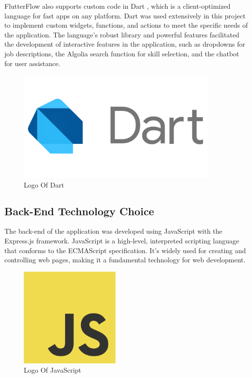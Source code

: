 FlutterFlow also supports custom code in {\color{purple} Dart} \cite{dart}, which is a client-optimized language for fast apps on any platform. Dart was used extensively in this project to implement custom widgets, functions, and actions to meet the specific needs of the application. The language's robust library and powerful features facilitated the development of interactive features in the application, such as dropdowns for job descriptions, the Algolia search function for skill selection, and the chatbot for user assistance.

\begin{figure}[H]
    \centering
    \includegraphics[width=10cm]{src/assets/logos/dartLogo.png}
    \caption{  Logo Of Dart }
    \label{fig: Dart_Logo}
\end{figure}

\subsection{Back-End Technology Choice}
The back-end of the application was developed using {\color{purple}JavaScript} with the {\color{purple}Express.js} framework. JavaScript is a high-level, interpreted scripting language that conforms to the ECMAScript specification. It's widely used for creating and controlling web pages, making it a fundamental technology for web development.

\begin{figure}[H]
    \centering
    \includegraphics[width=5cm]{src/assets/logos/js Logo.png}
    \caption{  Logo Of JavaScript }
    \label{fig: JS_Logo}
\end{figure}

